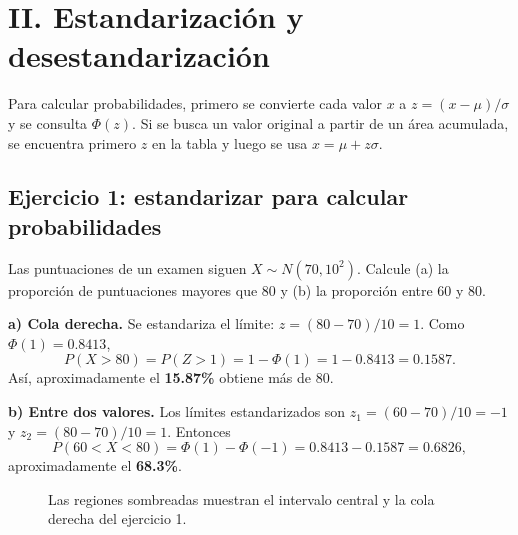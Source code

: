 \documentclass[11pt]{article}
\begin{document}
\clearpage
\section*{II. Estandarización y desestandarización}

Para calcular probabilidades, primero se convierte cada valor $x$ a $z=(x-\mu)/\sigma$ y se consulta $\Phi(z)$. Si se busca un valor original a partir de un área acumulada, se encuentra primero $z$ en la tabla y luego se usa $x=\mu+z\sigma$.

\subsection*{Ejercicio 1: estandarizar para calcular probabilidades}
Las puntuaciones de un examen siguen $X\sim N(70,10^2)$. Calcule (a) la proporción de puntuaciones mayores que 80 y (b) la proporción entre 60 y 80.

\textbf{a) Cola derecha.} Se estandariza el límite: $z=(80-70)/10=1$. Como $\Phi(1)=0.8413$,
\[
P(X>80)=P(Z>1)=1-\Phi(1)=1-0.8413=0.1587.
\]
Así, aproximadamente el \textbf{15.87\%} obtiene más de 80.

\textbf{b) Entre dos valores.} Los límites estandarizados son $z_1=(60-70)/10=-1$ y $z_2=(80-70)/10=1$. Entonces
\[
P(60<X<80)=\Phi(1)-\Phi(-1)=0.8413-0.1587=0.6826,
\]
aproximadamente el \textbf{68.3\%}.

\begin{figure}[htbp]
\centering
{}
\caption{Las regiones sombreadas muestran el intervalo central y la cola derecha del ejercicio 1.}
\label{fig:estandarizar}
\end{figure}
\end{document}
